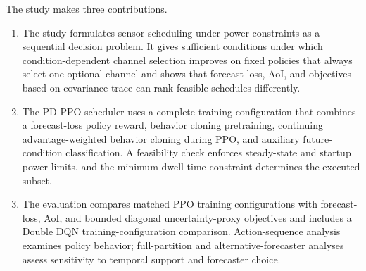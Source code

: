 The study makes three contributions.
\begin{enumerate}[leftmargin=1.4em]
  \item The study formulates sensor scheduling under power constraints as a
  sequential decision problem. It gives sufficient conditions under which
  condition-dependent channel selection improves on fixed policies that always
  select one optional channel
  and shows that forecast loss, AoI, and objectives based on covariance trace can rank feasible
  schedules differently.

  \item The PD-PPO scheduler uses a complete training configuration that combines
  a forecast-loss policy reward, behavior cloning pretraining, continuing
  advantage-weighted behavior cloning during PPO, and auxiliary future-condition
  classification. A feasibility check enforces steady-state and startup power
  limits, and the minimum dwell-time constraint
  determines the executed subset.

  \item The evaluation compares matched PPO training configurations with forecast-loss,
  AoI, and bounded diagonal uncertainty-proxy objectives and includes a
  Double DQN training-configuration comparison. Action-sequence analysis examines
  policy behavior; full-partition and alternative-forecaster analyses assess
  sensitivity to temporal support and forecaster choice.
\end{enumerate}
